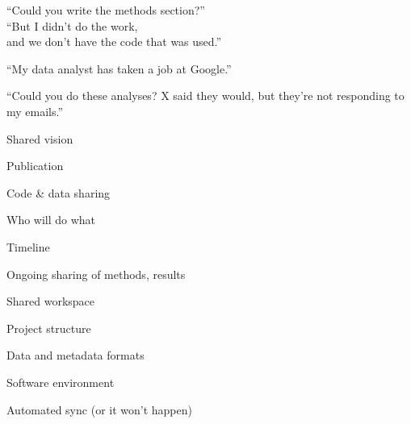 \documentclass[aspectratio=169,12pt,t]{beamer}
\begin{document}
\begin{frame}[c]{}

\begin{center}
  \Large


  ``Could you write the methods section?'' \\[36pt]
  ``But I didn't do the work, \\
  and we don't have the code that was used.''



\end{center}

\end{frame}





\begin{frame}[c]{}

\begin{center}
  \Large


``My data analyst has taken a job at Google.''

\end{center}

\end{frame}



\begin{frame}[c]{}

\begin{center}
  \Large


``Could you do these analyses? X said they would, but they're not
  responding to my emails.''

\end{center}

\end{frame}




\begin{frame}[c]{Shared vision}

  \bbi
\item Publication
\item Code \& data sharing
\item Who will do what
\item Timeline
\item Ongoing sharing of methods, results
  \ei

\end{frame}



\begin{frame}[c]{Shared workspace}

  \bbi
\item Project structure
\item Data and metadata formats
\item Software environment
\item Automated sync {\lolit (or it won't happen)}
  \ei

\end{frame}
\end{document}
